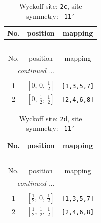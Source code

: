 \documentclass[fleqn,8pt]{jsarticle}
\begin{document}
\begin{longtable}{ccc}
\caption{Wyckoff site: {\tt 2c}, site symmetry: {\tt -11'}}
 \\
 \hline \hline
No. & position & mapping \\ \hline \endfirsthead

\multicolumn{2}{l}{\tablename\ \thetable{}} \\
 \hline \hline
No. & position & mapping \\ \hline \endhead

 \hline \hline
\multicolumn{2}{r}{\footnotesize\it continued ...} \\ \endfoot

 \hline \hline
\multicolumn{2}{r}{} \\ \endlastfoot

1 & $\left[ 0,\, 0,\, \frac{1}{2} \right]$ & {\tt [1,3,5,7]} \\ \hline
2 & $\left[ 0,\, \frac{1}{2},\, \frac{1}{2} \right]$ & {\tt [2,4,6,8]} \\
\end{longtable}
\renewcommand{\arraystretch}{1.2}
\begin{longtable}{ccc}
\caption{Wyckoff site: {\tt 2d}, site symmetry: {\tt -11'}}
 \\
 \hline \hline
No. & position & mapping \\ \hline \endfirsthead

\multicolumn{2}{l}{\tablename\ \thetable{}} \\
 \hline \hline
No. & position & mapping \\ \hline \endhead

 \hline \hline
\multicolumn{2}{r}{\footnotesize\it continued ...} \\ \endfoot

 \hline \hline
\multicolumn{2}{r}{} \\ \endlastfoot

1 & $\left[ \frac{1}{2},\, 0,\, \frac{1}{2} \right]$ & {\tt [1,3,5,7]} \\ \hline
2 & $\left[ \frac{1}{2},\, \frac{1}{2},\, \frac{1}{2} \right]$ & {\tt [2,4,6,8]} \\
\end{longtable}
\renewcommand{\arraystretch}{1.2}
\end{document}

